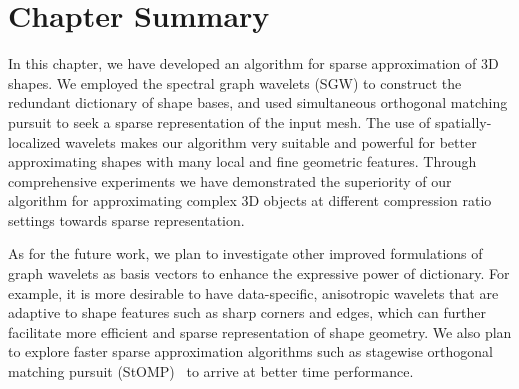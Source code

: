 \section{Chapter Summary}

In this chapter, we have developed an algorithm for sparse approximation
of 3D shapes. We employed the spectral graph wavelets (SGW) to
construct the redundant dictionary of shape bases, and used
simultaneous orthogonal matching pursuit to seek a sparse
representation of the input mesh. The use of spatially-localized
wavelets makes our algorithm very suitable and powerful for better
approximating shapes with many local and fine geometric features.
Through comprehensive experiments we have demonstrated the superiority
of our algorithm for approximating complex 3D objects at different
compression ratio settings towards sparse representation.

As for the future work, we plan to investigate other
improved formulations of graph wavelets as basis vectors to enhance
the expressive power of dictionary. For example, it is more desirable
to have data-specific, anisotropic wavelets that are adaptive to shape
features such as sharp corners and edges, which can further facilitate
more efficient and sparse representation of shape geometry. We also
plan to explore faster sparse approximation algorithms such as
stagewise orthogonal matching pursuit (StOMP)~\cite{Donoho2012} to
arrive at better time performance. 